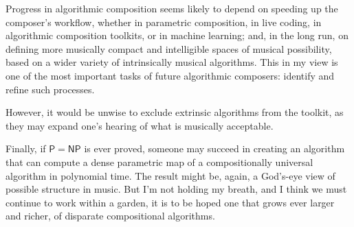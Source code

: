 \documentclass[11pt]{scrartcl}
\begin{document}
Progress in algorithmic composition seems likely to depend on speeding up the composer's workflow, whether in parametric composition, in live coding, in algorithmic composition toolkits, or in machine learning; and, in the long run, on defining more musically compact and intelligible spaces of musical possibility, based on a wider variety of intrinsically musical algorithms. This in my view is one of the most important tasks of future algorithmic composers: identify and refine such processes. 

However, it would be unwise to exclude extrinsic algorithms from the toolkit, as they may expand one's hearing of what is musically acceptable.

Finally, if $\mathsf{P} = \mathsf{NP}$ is ever proved, someone may succeed in creating an algorithm that can compute a dense parametric map of a compositionally universal algorithm in polynomial time. The result might be, again, a God's-eye view of possible structure in music. But I'm not holding my breath, and I think we must continue to work within a garden, it is to be hoped one that grows ever larger and richer, of disparate compositional algorithms.

\printbibliography
\end{document}
